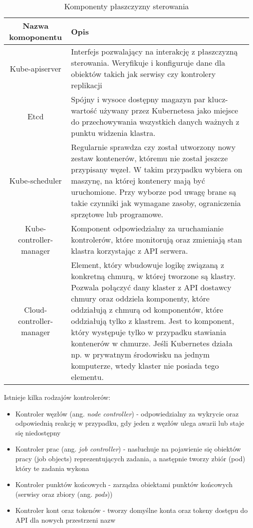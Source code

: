 \begin{xltabular}{1\textwidth} { 
  | >{\raggedright\arraybackslash}c 
  | >{\raggedright\arraybackslash}X | }
  \caption{Komponenty płaszczyzny sterowania} \label{tab:komponenty-sterowania}\\
  \hline
 Nazwa komoponentu & Opis \\
 \hline
 Kube-apiserver & Interfejs pozwalający na interakcję z płaszczyzną sterowania. 
 Weryfikuje i konfiguruje dane dla obiektów takich jak serwisy czy kontrolery 
 replikacji \\
 \hline
 Etcd & Spójny i wysoce dostępny magazyn par klucz-wartość używany przez Kubernetesa 
 jako miejsce do przechowywania wszystkich danych ważnych z punktu widzenia klastra.  \\
 \hline
 Kube-scheduler & Regularnie sprawdza czy został utworzony nowy zestaw 
 kontenerów, któremu nie został jeszcze przypisany węzeł. W takim przypadku wybiera 
 on maszynę, na której kontenery mają być uruchomione. Przy wyborze pod uwagę brane są 
 takie czynniki jak wymagane zasoby, ograniczenia sprzętowe lub programowe. \\
 \hline
 Kube-controller-manager & Komponent odpowiedzialny za uruchamianie kontrolerów, które 
 monitorują oraz zmieniają stan klastra korzystając z API serwera. \\
 \hline
 Cloud-controller-manager & Element, który wbudowuje logikę związaną z konkretną 
 chmurą, w której tworzone są klastry. Pozwala połączyć dany klaster z API dostawcy 
 chmury oraz oddziela komponenty, które oddziałują z chmurą od komponentów, które 
 oddziałują tylko z klastrem. Jest to komponent, który występuje tylko w przypadku 
 stawiania kontenerów w chmurze. Jeśli Kubernetes działa np. w prywatnym środowisku 
 na jednym komputerze, wtedy klaster nie posiada tego elementu. \\
 \hline
\end{xltabular}

Istnieje kilka rodzajów kontrolerów:

\begin{itemize}
    \item Kontroler węzłów (ang. \textit{node controller}) - odpowiedzialny za wykrycie oraz 
    odpowiednią reakcję w przypadku, gdy jeden z węzłów ulega awarii lub staje się 
    niedostępny
    \item Kontroler prac (ang. \textit{job controller}) - nasłuchuje na pojawienie się obiektów 
    pracy (job objects) reprezentujących zadania, a następnie tworzy zbiór (pod) który 
    te zadania wykona
    \item Kontroler punktów końcowych - zarządza obiektami punktów końcowych (serwisy 
    oraz zbiory (ang. \textit{pods}))
    \item Kontroler kont oraz tokenów - tworzy domyślne konta oraz tokeny dostępu do 
    API dla nowych przestrzeni nazw
\end{itemize}

